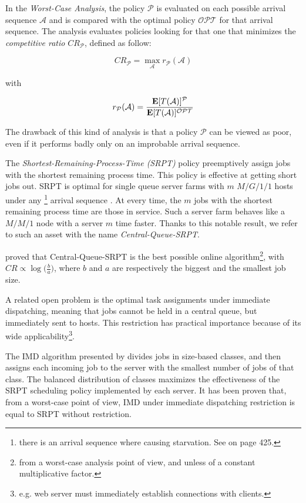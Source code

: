 In the \textit{Worst-Case Analysis}, the policy $\mathcal{P}$ is evaluated on each possible arrival sequence $\mathcal{A}$ and is compared with the optimal policy $\mathcal{OPT}$ for that arrival sequence.
The analysis evaluates policies looking for that one that minimizes the \textit{competitive ratio} $CR_{\mathcal{P}}$, defined as follow:

 \begin{equation}
 CR_{\mathcal{P}}=\max_{\mathcal{A}}r_{\mathcal{P}}(\mathcal{A})
 \end{equation}
 
 with
 
 \begin{equation}
 r_{\mathcal{P}}(\mathcal{A})=\frac{\mathbf{E}[T(\mathcal{A})]^{\mathcal{P}}}{\mathbf{E}[T(\mathcal{A})]^{\mathcal{OPT}}}
 \end{equation}
 
 The drawback of this kind of analysis is that a policy $\mathcal{P}$ can be viewed as poor, even if it performs badly only on an improbable arrival sequence.
 
 The \textit{Shortest-Remaining-Process-Time (SRPT)} policy preemptively assign jobs with the shortest remaining process time. This policy is effective at getting short jobs out.
 SRPT is optimal for single queue server farms with $m$ $M/G/1/1$ hosts under any \footnote{there is an arrival sequence where causing starvation. See \cite{harchol2013performance} on page 425.} arrival sequence \cite{schrage1968letter}.
 At every time, the $m$ jobs with the shortest remaining process time are those in service. Such a server farm behaves like a $M/M/1$ node with a server $m$ time faster.
 Thanks to this notable result, we refer to such an asset with the name \textit{Central-Queue-SRPT}.
 
 \cite{leonardi1997approximating} proved that Central-Queue-SRPT is the best possible online algorithm\footnote{from a worst-case analysis point of view, and unless of a constant multiplicative factor.}, with $CR\propto\log\Big(\frac{b}{a}\Big)$, where $b$ and $a$ are respectively the biggest and the smallest job size.

A related open problem is the optimal task assignments under immediate dispatching, meaning that jobs cannot be held in a central queue, but immediately sent to hosts.
This restriction has practical importance because of its wide applicability\footnote{e.g. web server must immediately establish connections with clients.}.

The IMD algorithm presented by \cite{avrahami2003minimizing} divides jobs in size-based classes, and then assigns each incoming job to the server with the smallest number of jobs of that class. The balanced distribution of classes maximizes the effectiveness of the SRPT scheduling policy implemented by each server. It has been proven that, from a worst-case point of view, IMD under immediate dispatching restriction is equal to SRPT without restriction.
 